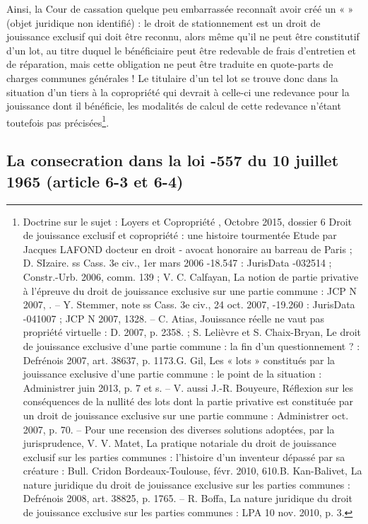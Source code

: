 			Ainsi, la Cour de cassation quelque peu embarrassée reconnaît avoir créé un «  » (objet juridique non
			identifié) : le droit de stationnement est un droit de jouissance exclusif qui doit être reconnu, alors même
			qu’il ne peut être constitutif d’un lot, au titre duquel le bénéficiaire peut être redevable de frais d’entretien
			et de réparation, mais cette obligation ne peut être traduite en quote-parts de charges communes
			générales ! Le titulaire d’un tel lot se trouve donc dans la situation d’un tiers à la copropriété qui devrait à
			celle-ci une redevance pour la jouissance dont il bénéficie, les modalités de calcul de cette redevance
			n’étant toutefois pas précisées\footnote{Doctrine sur le sujet : Loyers et Copropriété , Octobre 2015, dossier 6 Droit de jouissance exclusif et copropriété : une histoire	tourmentée Etude par Jacques LAFOND docteur en droit - avocat honoraire au barreau de Paris ; D. SIzaire. ss Cass. 3e civ., 1er mars 2006 -18.547 : JurisData -032514 ; Constr.-Urb. 2006, comm. 139 ; V. C. Calfayan, La notion de partie privative à l'épreuve du droit de jouissance exclusive sur une partie commune : JCP N 2007, . – Y. Stemmer, note ss Cass. 3e civ., 24 oct. 2007, -19.260 : JurisData -041007 ; JCP N 2007, 1328. – C. Atias, Jouissance réelle ne vaut pas propriété virtuelle : D. 2007, p. 2358. ; S. Lelièvre et S. Chaix-Bryan, Le droit de jouissance exclusive d'une partie commune : la fin d'un questionnement ? : Defrénois 2007, art. 38637, p. 1173.G. Gil, Les « lots » constitués par la jouissance exclusive d'une partie commune : le point de la situation :	Administrer juin 2013, p. 7 et s. – V. aussi J.-R. Bouyeure, Réflexion sur les conséquences de la nullité des lots dont la partie privative est constituée par un droit de jouissance exclusive sur une partie commune : Administrer oct. 2007, p. 70. – Pour une recension des diverses solutions adoptées, par la jurisprudence, V. V. Matet, La pratique notariale du droit de jouissance exclusif sur les parties communes :	l'histoire d'un inventeur dépassé par sa créature : Bull. Cridon Bordeaux-Toulouse, févr. 2010, 610.B. Kan-Balivet, La nature juridique du droit de jouissance exclusive sur les parties communes : Defrénois 2008, art. 38825, p. 1765. – R. Boffa, La nature juridique du droit de	jouissance exclusive sur les parties communes : LPA 10 nov. 2010, p. 3.}.
	
	\subsection{La consecration dans la loi -557 du 10 juillet 1965 (article 6-3 et 6-4)}
	
